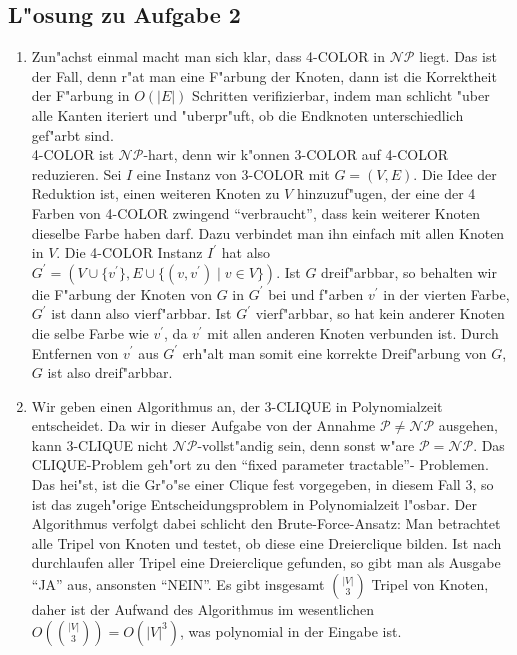\documentclass[10pt,oneside,onecolumn,a4paper,german,titlepage]{article}
\begin{document}
\subsection*{L"osung zu Aufgabe 2}
\begin{enumerate}
\item
Zun"achst einmal macht man sich klar, dass 4-COLOR in $\mathcal{NP}$ liegt. Das ist
der Fall, denn r"at man eine F"arbung der Knoten, dann ist die Korrektheit der
F"arbung in $O(|E|)$ Schritten verifizierbar, indem man schlicht "uber alle Kanten
iteriert und "uberpr"uft, ob die Endknoten unterschiedlich gef"arbt sind.\\
4-COLOR ist $\mathcal{NP}$-hart, denn wir k"onnen 3-COLOR auf 4-COLOR reduzieren.
Sei $I$ eine Instanz von 3-COLOR mit $G = (V,E)$. Die Idee der Reduktion ist, einen
weiteren Knoten zu $V$ hinzuzuf"ugen, der eine der 4 Farben von 4-COLOR zwingend
``verbraucht'', dass kein weiterer Knoten dieselbe Farbe haben darf. Dazu verbindet
man ihn einfach mit allen Knoten in $V$. Die 4-COLOR Instanz $I^\prime$ hat also
$G^\prime = (V \cup \{v^\prime\}, E \cup \{(v,v^\prime) \; | \; v \in V\})$. Ist
$G$ dreif"arbbar, so behalten wir die F"arbung der Knoten von $G$ in $G^\prime$ bei
und f"arben $v^\prime$ in der vierten Farbe, $G^\prime$ ist dann also vierf"arbbar.
Ist $G^\prime$ vierf"arbbar, so hat kein anderer Knoten die selbe Farbe wie
$v^\prime$, da $v^\prime$ mit allen anderen Knoten verbunden ist. Durch Entfernen
von $v^\prime$ aus $G^\prime$ erh"alt man somit eine korrekte Dreif"arbung von $G$,
$G$ ist also dreif"arbbar.
\item
Wir geben einen Algorithmus an, der 3-CLIQUE in Polynomialzeit entscheidet. Da wir
in dieser Aufgabe von der Annahme $\mathcal{P} \neq \mathcal{NP}$ ausgehen, kann
3-CLIQUE nicht $\mathcal{NP}$-vollst"andig sein, denn sonst w"are $\mathcal{P} =
\mathcal{NP}$. Das CLIQUE-Problem geh"ort zu den ``fixed parameter tractable''-
Problemen. Das hei"st, ist die Gr"o"se einer Clique fest vorgegeben, in diesem
Fall 3, so ist das zugeh"orige Entscheidungsproblem in Polynomialzeit l"osbar.
Der Algorithmus verfolgt dabei schlicht den Brute-Force-Ansatz: Man betrachtet
alle Tripel von Knoten und testet, ob diese eine Dreierclique bilden. Ist nach
durchlaufen aller Tripel eine Dreierclique gefunden, so gibt man als Ausgabe ``JA''
aus, ansonsten ``NEIN''. Es gibt insgesamt ${|V| \choose 3}$ Tripel von Knoten,
daher ist der Aufwand des Algorithmus im wesentlichen $O({|V| \choose 3}) =
O(|V|^3)$, was polynomial in der Eingabe ist.
\end{enumerate}
\end{document}
